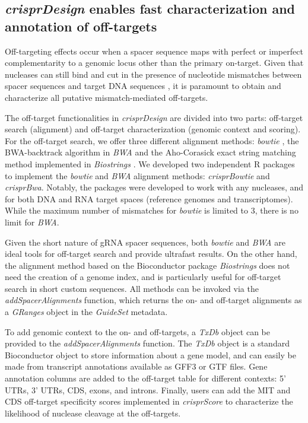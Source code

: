 \documentclass[pdftex,english,10pt]{article}
\begin{document}
\subsection{\textit{crisprDesign} enables fast characterization and annotation of off-targets}

Off-targeting effects occur when a spacer sequence maps with
perfect or imperfect complementarity to a genomic locus other than the primary on-target.
Given that nucleases can still bind and cut in the presence of nucleotide mismatches between spacer sequences and target DNA sequences \citep{offtarget1,offtarget2,offtarget3}, it is paramount to obtain and characterize all putative mismatch-mediated off-targets.

The off-target functionalities in \textit{crisprDesign} are divided into two parts: off-target search (alignment) and off-target characterization (genomic context and scoring). For the off-target search, we offer three different alignment methods: \textit{bowtie} \citep{bowtie}, the BWA-backtrack algorithm in \textit{BWA} \citep{bwa} and the Aho-Corasick exact string matching method implemented in \textit{Biostrings} \citep{aho1975efficient,pages2016biostrings}. 
We developed two independent R packages to implement the \textit{bowtie} and \textit{BWA} alignment methods: \textit{crisprBowtie} and \textit{crisprBwa}. 
Notably, the packages were developed to work with any nucleases, and for both DNA and RNA target spaces (reference genomes and transcriptomes). 
While the maximum number of mismatches for \textit{bowtie} is limited to 3, there is no limit for \textit{BWA}. 

Given the short nature of gRNA spacer sequences, both \textit{bowtie} and \textit{BWA} are ideal tools for off-target search and provide ultrafast results.
On the other hand, the alignment method based on the Bioconductor package \textit{Biostrings} does not need the creation of a genome index, and is particularly useful for off-target search in short custom sequences. All methods can be invoked via the \textit{addSpacerAlignments} function, which returns the on- and off-target alignments as a \textit{GRanges} object in the \textit{GuideSet} metadata.


To add genomic context to the on- and off-targets, a \textit{TxDb} object can be provided to the \textit{addSpacerAlignments} function. 
The \textit{TxDb} object is a standard Bioconductor object to store information about a gene model, and can easily be made from transcript annotations available as GFF3 or GTF files. Gene annotation columns are added to the off-target table for different contexts: 5' UTRs, 3' UTRs, CDS, exons, and introns. Finally, users can add the MIT and CDS off-target specificity scores \citep{mit, azimuth} implemented in \textit{crisprScore} to characterize the likelihood of nuclease cleavage at the off-targets. 
\end{document}
